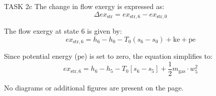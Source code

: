 TASK 2c  
The change in flow exergy is expressed as:  
\[
\Delta ex_{\text{str}} = ex_{\text{str},6} - ex_{\text{str},0}
\]

The flow exergy at state 6 is given by:  
\[
ex_{\text{str},6} = h_6 - h_0 - T_0(s_6 - s_0) + \text{ke} + \text{pe}
\]

Since potential energy (\( \text{pe} \)) is set to zero, the equation simplifies to:  
\[
ex_{\text{str},6} = h_6 - h_5 - T_0[s_6 - s_5] + \frac{1}{2} m_{\text{gas}} \cdot w_5^2
\]  

No diagrams or additional figures are present on the page.